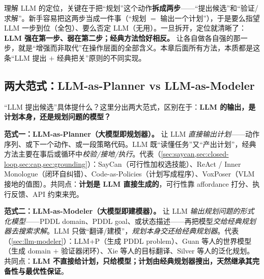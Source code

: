 \begin{insight}
理解 LLM 的定位，关键在于把“规划”这个动作\textbf{拆成两步}——“提出候选”和“验证/求解”。新手容易把这两步当成一件事（“规划 $=$ 输出一个计划”），于是要么指望 LLM 一步到位（全包）、要么否定 LLM（无用）。一旦拆开，定位就清晰了：\textbf{LLM 强在第一步、弱在第二步；经典方法恰好相反。} 让各自做各自强的那一步，就是“增强而非取代”在操作层面的全部含义。本章后面所有方法，本质都是这条“LLM 提出 $+$ 经典把关”原则的不同实现。
\end{insight}

\subsection{两大范式：LLM-as-Planner vs LLM-as-Modeler}
\label{sec:two-paradigms}

“LLM 提出候选”具体提什么？这里分出两大范式，区别在于：\textbf{LLM 的输出，是计划本身，还是规划问题的模型？}

\textbf{范式一：LLM-as-Planner（大模型即规划器）。} 让 LLM \emph{直接输出计划}——动作序列、或下一个动作、或一段策略代码。LLM 既“读懂任务”又“产出计划”，经典方法主要在事后或循环中\emph{校验/接地/执行}。代表（\cref{sec:saycan,sec:closed-loop,sec:cap,sec:grounding}）：SayCan（可行性加权选技能）、ReAct / Inner Monologue（闭环自纠错）、Code-as-Policies（计划写成程序）、VoxPoser（VLM 接地的值图）。共同点：\textbf{计划是 LLM 直接生成的}，可行性靠 affordance 打分、执行反馈、API 约束来兜。

\textbf{范式二：LLM-as-Modeler（大模型即建模器）。} 让 LLM \emph{输出规划问题的形式化模型}——PDDL domain、PDDL goal、或状态描述——再把模型\emph{交给经典规划器去搜索求解}。LLM 只做“翻译/建模”，\emph{规划本身交还给经典规划器}。代表（\cref{sec:llm-modeler}）：LLM+P（生成 PDDL problem）、Guan 等人的世界模型（生成 domain $+$ 验证器闭环）、Xie 等人的目标翻译、Silver 等人的泛化规划。共同点：\textbf{LLM 不直接给计划，只给模型；计划由经典规划器搜出，天然继承其完备性与最优性保证}。

